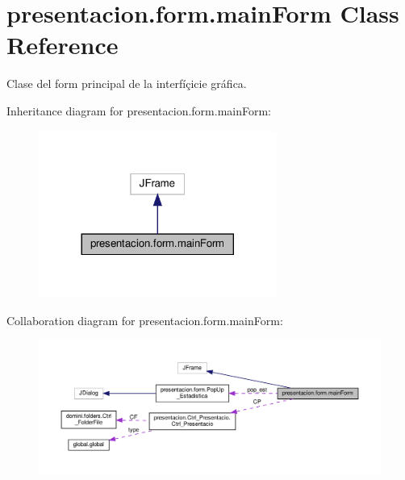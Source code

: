 \hypertarget{classpresentacion_1_1form_1_1mainForm}{}\section{presentacion.\+form.\+main\+Form Class Reference}
\label{classpresentacion_1_1form_1_1mainForm}


Clase del form principal de la interfíçicie gráfica.  




Inheritance diagram for presentacion.\+form.\+main\+Form\+:
\nopagebreak
\begin{figure}[H]
\begin{center}
\leavevmode
\includegraphics[width=221pt]{classpresentacion_1_1form_1_1mainForm__inherit__graph}
\end{center}
\end{figure}


Collaboration diagram for presentacion.\+form.\+main\+Form\+:
\nopagebreak
\begin{figure}[H]
\begin{center}
\leavevmode
\includegraphics[width=350pt]{classpresentacion_1_1form_1_1mainForm__coll__graph}
\end{center}
\end{figure}
